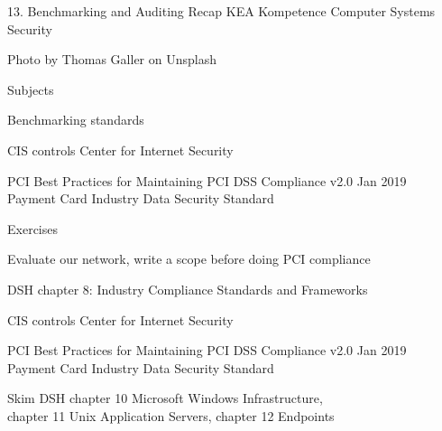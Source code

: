 \documentclass[Screen16to9,17pt]{foils}
\begin{document}
\mytitlepage
{13. Benchmarking and Auditing Recap}
{KEA Kompetence Computer Systems Security \the\year}





\begin{list2}
\item
\end{list2}

{\small\hfill  Photo by Thomas Galler on Unsplash}


\begin{list1}
\item Subjects
\begin{list2}
\item Benchmarking standards
\item CIS controls Center for Internet Security
\item PCI Best Practices for Maintaining PCI DSS Compliance v2.0 Jan 2019\\
Payment Card Industry Data Security Standard

\end{list2}
\item Exercises
\begin{list2}
\item Evaluate our network, write a scope before doing PCI compliance
\end{list2}
\end{list1}


\begin{list1}
\item DSH chapter 8: Industry Compliance Standards and Frameworks
\item CIS controls Center for Internet Security
\item PCI Best Practices for Maintaining PCI DSS Compliance v2.0 Jan 2019\\
Payment Card Industry Data Security Standard
\item Skim DSH chapter 10 Microsoft Windows Infrastructure, \\
chapter 11 Unix Application Servers, chapter 12 Endpoints
\end{list1}


\end{document}
